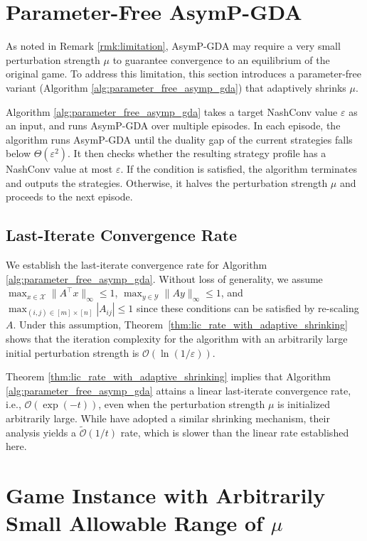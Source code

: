 \documentclass{article}
\newcommand{\X}{\mathcal{X}}
\newcommand{\Y}{\mathcal{Y}}
\theoremstyle{plain}
\begin{document}
\section{Parameter-Free AsymP-GDA}
\label{sec:appx_adaptively_asymmetric_perturbation}
As noted in Remark \ref{rmk:limitation}, AsymP-GDA may require a very small perturbation strength $\mu$ to guarantee convergence to an equilibrium of the original game.
To address this limitation, this section introduces a parameter-free variant (Algorithm \ref{alg:parameter_free_asymp_gda}) that adaptively shrinks $\mu$.

Algorithm \ref{alg:parameter_free_asymp_gda} takes a target NashConv value $\varepsilon$ as an input, and runs AsymP-GDA over multiple episodes.
In each episode, the algorithm runs AsymP-GDA until the duality gap of the current strategies falls below $\Theta(\varepsilon^2)$.
It then checks whether the resulting strategy profile has a NashConv value at most $\varepsilon$.
If the condition is satisfied, the algorithm terminates and outputs the strategies.
Otherwise, it halves the perturbation strength $\mu$ and proceeds to the next episode.

\subsection{Last-Iterate Convergence Rate}
We establish the last-iterate convergence rate for Algorithm \ref{alg:parameter_free_asymp_gda}.
Without loss of generality, we assume $\max_{x\in \X}\|A^{\top}x\|_{\infty} \leq 1$, $\max_{y\in \Y}\|Ay\|_{\infty} \leq 1$, and $\max_{(i,j)\in [m]\times [n]}|A_{ij}| \leq 1$ since these conditions can be satisfied by re-scaling $A$.
Under this assumption, Theorem~\ref{thm:lic_rate_with_adaptive_shrinking} shows that the iteration complexity for the algorithm with an arbitrarily large initial perturbation strength is $\mathcal{O}(\ln(1/\varepsilon))$.

Theorem \ref{thm:lic_rate_with_adaptive_shrinking} implies that Algorithm \ref{alg:parameter_free_asymp_gda} attains a linear last-iterate convergence rate, i.e., $\mathcal{O}(\exp(-t))$, even when the perturbation strength $\mu$ is initialized arbitrarily large.
While \citet{liu2022power} have adopted a similar shrinking mechanism, their analysis yields a $\tilde{\mathcal{O}}(1/t)$ rate, which is slower than the linear rate established here.


\section{Game Instance with Arbitrarily Small Allowable Range of $\mu$}
\label{sec:appx_arbitrarily_small_allowable_range}
\end{document}
